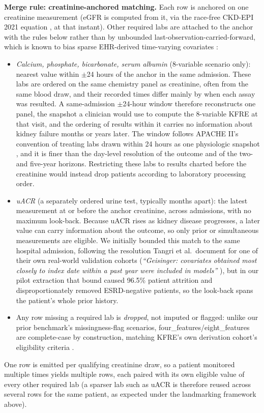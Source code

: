 \textbf{Merge rule: creatinine-anchored matching.} Each row is anchored on one creatinine measurement (eGFR is computed from it, via the race-free CKD-EPI 2021 equation \citep{inker2021ckdepi}, at that instant). Other required labs are attached to the anchor with the rules below rather than by unbounded last-observation-carried-forward, which is known to bias sparse EHR-derived time-varying covariates \citep{hu2022locf_bias}:
\begin{itemize}
    \item \textit{Calcium, phosphate, bicarbonate, serum albumin} (8-variable scenario only): nearest value within $\pm$24 hours of the anchor in the same admission. These labs are ordered on the same chemistry panel as creatinine, often from the same blood draw, and their recorded times differ mainly by when each assay was resulted. A same-admission $\pm$24-hour window therefore reconstructs one panel, the snapshot a clinician would use to compute the 8-variable KFRE at that visit, and the ordering of results within it carries no information about kidney failure months or years later. The window follows APACHE II's convention of treating labs drawn within 24 hours as one physiologic snapshot \citep{knaus1985apacheii}, and it is finer than the day-level resolution of the outcome and of the two- and five-year horizons. Restricting these labs to results charted before the creatinine would instead drop patients according to laboratory processing order.
    \item \textit{uACR} (a separately ordered urine test, typically months apart): the latest measurement at or before the anchor creatinine, across admissions, with no maximum look-back. Because uACR rises as kidney disease progresses, a later value can carry information about the outcome, so only prior or simultaneous measurements are eligible. We initially bounded this match to the same hospital admission, following the resolution Tangri et al.\ document for one of their own real-world validation cohorts (\textit{``Geisinger: covariates obtained most closely to index date within a past year were included in models''} \citep{tangri2016multinational}), but in our pilot extraction that bound caused 96.5\% patient attrition and disproportionately removed ESRD-negative patients, so the look-back spans the patient's whole prior history.
    \item Any row missing a required lab is \emph{dropped}, not imputed or flagged: unlike our prior benchmark's missingness-flag scenarios, four\_features/eight\_features are complete-case by construction, matching KFRE's own derivation cohort's eligibility criteria \citep{tangri2011predicting}.
\end{itemize}
One row is emitted per qualifying creatinine draw, so a patient monitored multiple times yields multiple rows, each paired with its own eligible value of every other required lab (a sparser lab such as uACR is therefore reused across several rows for the same patient, as expected under the landmarking framework above).

